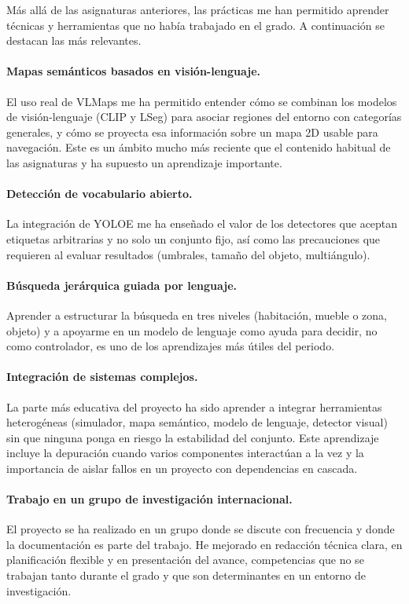 \documentclass[11pt,fleqn,openany]{book} %
\begin{document}
Más allá de las asignaturas anteriores, las prácticas me han permitido aprender técnicas y herramientas que no había trabajado en el grado. A continuación se destacan las más relevantes.

\paragraph{Mapas semánticos basados en visión-lenguaje.} El uso real de VLMaps me ha permitido entender cómo se combinan los modelos de visión-lenguaje (CLIP y LSeg) para asociar regiones del entorno con categorías generales, y cómo se proyecta esa información sobre un mapa 2D usable para navegación. Este es un ámbito mucho más reciente que el contenido habitual de las asignaturas y ha supuesto un aprendizaje importante.

\paragraph{Detección de vocabulario abierto.} La integración de YOLOE me ha enseñado el valor de los detectores que aceptan etiquetas arbitrarias y no solo un conjunto fijo, así como las precauciones que requieren al evaluar resultados (umbrales, tamaño del objeto, multiángulo).

\paragraph{Búsqueda jerárquica guiada por lenguaje.} Aprender a estructurar la búsqueda en tres niveles (habitación, mueble o zona, objeto) y a apoyarme en un modelo de lenguaje como ayuda para decidir, no como controlador, es uno de los aprendizajes más útiles del periodo.

\paragraph{Integración de sistemas complejos.} La parte más educativa del proyecto ha sido aprender a integrar herramientas heterogéneas (simulador, mapa semántico, modelo de lenguaje, detector visual) sin que ninguna ponga en riesgo la estabilidad del conjunto. Este aprendizaje incluye la depuración cuando varios componentes interactúan a la vez y la importancia de aislar fallos en un proyecto con dependencias en cascada.

\paragraph{Trabajo en un grupo de investigación internacional.} El proyecto se ha realizado en un grupo donde se discute con frecuencia y donde la documentación es parte del trabajo. He mejorado en redacción técnica clara, en planificación flexible y en presentación del avance, competencias que no se trabajan tanto durante el grado y que son determinantes en un entorno de investigación.
\end{document}
